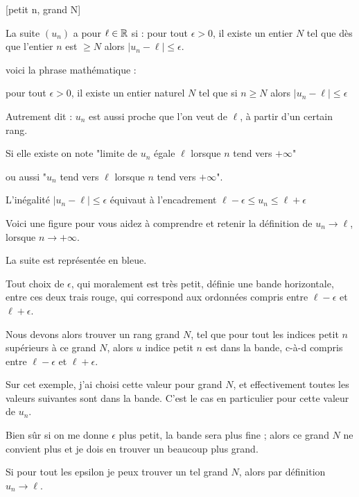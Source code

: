 \change

[petit n, grand N]

La suite $(u_n)$ a pour  $\ell\in \mathbb{R}$ si : 
pour tout $\epsilon >0$, il existe un entier 
$N$ tel que dès que l'entier $n$ est $\geq N$ alors $\lvert u_n-\ell\rvert\leq\epsilon$. 

\change

voici la phrase mathématique :

pour tout $\epsilon >0$, il existe un entier naturel $N$ 
tel que si $n\geq N$ alors $\lvert u_n-\ell\rvert\leq\epsilon$

Autrement dit : $u_n$ est aussi proche que l'on veut de $\ell$, à partir d'un certain rang.

\change

Si elle existe on note "limite de $u_n$ égale $\ell$ lorsque $n$ tend vers $+\infty$"

ou aussi "$u_n$ tend vers $\ell$ lorsque $n$ tend vers $+\infty$".

\change

L'inégalité $|u_n-\ell| \le \epsilon$ équivaut à l'encadrement 
$\ell-\epsilon \le u_n \le \ell +\epsilon$

\diapo

Voici une figure pour vous aidez à comprendre et retenir la définition
de $u_n\to \ell$, lorsque $n\to +\infty$.

\change


La suite est représentée en bleue.



Tout choix de $\epsilon$, qui moralement est très petit,
définie une bande horizontale, entre ces deux trais rouge, qui correspond aux ordonnées compris
entre $\ell-\epsilon$ et $\ell+\epsilon$.

Nous devons alors trouver un rang grand $N$, tel que pour tout les indices petit $n$
supérieurs à ce grand $N$, alors $u$ indice petit $n$ est dans la bande, c-à-d compris entre 
$\ell-\epsilon$ et $\ell+\epsilon$.

Sur cet exemple, j'ai choisi cette valeur pour grand $N$, 
et effectivement toutes les valeurs suivantes sont dans la bande.
C'est le cas en particulier pour cette valeur de $u_n$.

Bien sûr si on me donne $\epsilon$ plus petit, la bande sera plus fine ; 
alors ce grand $N$ ne convient plus et je dois en trouver un beaucoup plus grand.

Si pour tout les epsilon je peux trouver un tel grand $N$, alors par définition
$u_n \to \ell$.



